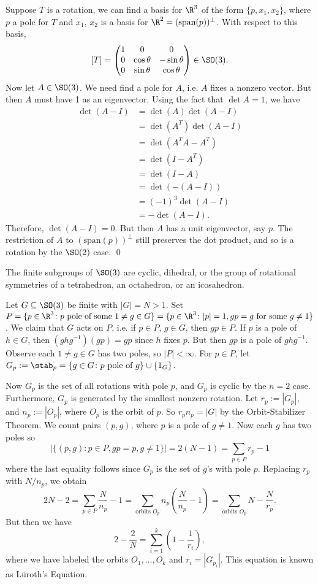 \pf Suppose $T$ is a rotation, we can find a basis for $\R^3$ of the form $\{p,x_1,x_2\}$, where $p$ a pole for $T$ and $x_1$, $x_2$ is a basis for $\R^2= (\text{span}(p))^\perp$. With respect to this basis, 
	\[
	[T]= \begin{pmatrix}
	1 & 0 & 0 \\
	0 & \cos \theta & -\sin \theta \\
	0 & \sin \theta & \cos \theta
	\end{pmatrix} \in \SO(3).
	\]
Now let $A \in \SO(3)$. We need find a pole for $A$, i.e. $A$ fixes a nonzero vector. But then $A$ must have 1 as an eigenvector. Using the fact that $\det A=1$, we have
	\[
	\begin{split}
	\det(A-I)&= \det(A)\det(A-I) \\
	&=\det(A^T)\det(A-I) \\
	&= \det(A^TA-A^T) \\
	&=\det(I-A^T) \\
	&=\det(I-A) \\
	&= \det(-(A-I)) \\
	&= (-1)^3 \det(A-I) \\
	&= - \det(A-I).
	\end{split}
	\]
Therefore, $\det(A-I)=0$. But then $A$ has a unit eigenvector, say $p$. The restriction of $A$ to $(\text{span}(p))^\perp$ still preserves the dot product, and so is a rotation by the $\SO(2)$ case. \qed \\


\begin{thm}
The finite subgroups of $\SO(3)$ are cyclic, dihedral, or the group of rotational symmetries of a tetrahedron, an octahedron, or an icosahedron. 
\end{thm}

\pf Let $G \subseteq \SO(3)$ be finite with $|G|=N>1$. Set $P=\{p \in \R^3 \colon p \text{ pole of some }1\neq g \in G\}= \{ p \in \R^3 \colon |p|=1, gp=g \text{ for some }g\neq 1\}$. We claim that $G$ acts on $P$, i.e. if $p \in P$, $g \in G$, then $gp \in P$. If $p$ is a pole of $h \in G$, then $(ghg^{-1})(gp)=gp$ since $h$ fixes $p$. But then $gp$ is a pole of $ghg^{-1}$. Observe each $1 \neq g \in G$ has two poles, so $|P|<\infty$. For $p \in P$, let $G_p:= \stab_p=\{g \in G \colon p \text{ pole of }g\} \cup \{1_G\}$. 

Now $G_p$ is the set of all rotations with pole $p$, and $G_p$ is cyclic by the $n=2$ case. Furthermore, $G_p$ is generated by the smallest nonzero rotation. Let $r_p:= |G_p|$, and $n_p:=|O_p|$, where $O_p$ is the orbit of $p$. So $r_pn_p=|G|$ by the Orbit-Stabilizer Theorem. We count pairs $(p,g)$, where $p$ is a pole of $g \neq 1$. Now each $g$ has two poles so
	\[
	|\{ (p,g) \colon p \in P, gp=p, g \neq 1\}| = 2 (N-1) = \sum_{p \in P} r_p - 1
	\]
where the last equality follows since $G_p$ is the set of $g$'s with pole $p$. Replacing $r_p$ with $N/n_p$, we obtain 
	\[
	2N-2 = \sum_{p \in P} \dfrac{N}{n_p} -1 = \sum_{\text{orbits }O_p} n_p \left(\dfrac{N}{n_p} -1 \right) = \sum_{\text{orbits }O_p} N - \dfrac{N}{r_p}.
	\]
But then we have
	\[
	2 - \dfrac{2}{N} = \sum_{i=1}^k \left( 1 - \dfrac{1}{r_i}\right),
	\]
where we have labeled the orbits $O_1,\ldots,O_k$ and $r_i= |G_{p_i}|$. This equation is known as L\"uroth's Equation. 


